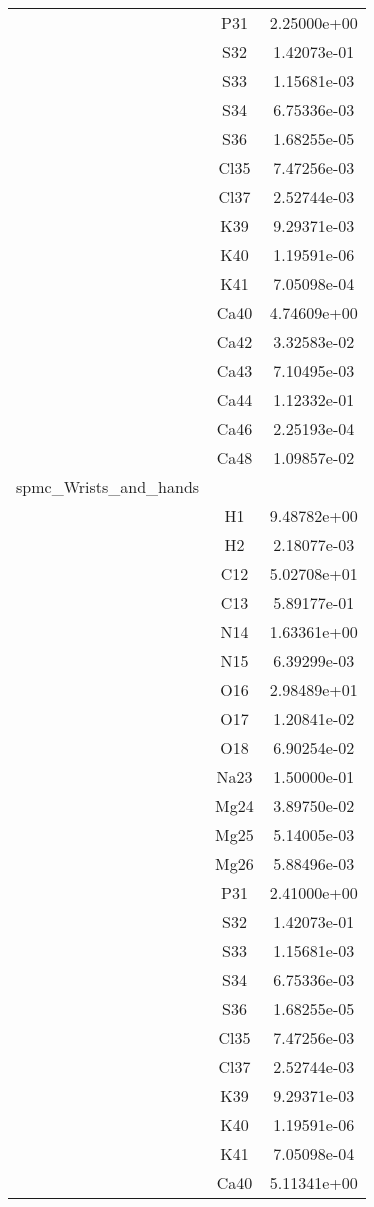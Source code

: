 \begin{centering}
\begin{longtable}{l c c}
& P31 & 2.25000e+00 \\ 
& S32 & 1.42073e-01 \\ 
& S33 & 1.15681e-03 \\ 
& S34 & 6.75336e-03 \\ 
& S36 & 1.68255e-05 \\ 
& Cl35 & 7.47256e-03 \\ 
& Cl37 & 2.52744e-03 \\ 
& K39 & 9.29371e-03 \\ 
& K40 & 1.19591e-06 \\ 
& K41 & 7.05098e-04 \\ 
& Ca40 & 4.74609e+00 \\ 
& Ca42 & 3.32583e-02 \\ 
& Ca43 & 7.10495e-03 \\ 
& Ca44 & 1.12332e-01 \\ 
& Ca46 & 2.25193e-04 \\ 
& Ca48 & 1.09857e-02 \\ 
\hline
spmc_Wrists_and_hands & & \\
\hline
& H1 & 9.48782e+00 \\ 
& H2 & 2.18077e-03 \\ 
& C12 & 5.02708e+01 \\ 
& C13 & 5.89177e-01 \\ 
& N14 & 1.63361e+00 \\ 
& N15 & 6.39299e-03 \\ 
& O16 & 2.98489e+01 \\ 
& O17 & 1.20841e-02 \\ 
& O18 & 6.90254e-02 \\ 
& Na23 & 1.50000e-01 \\ 
& Mg24 & 3.89750e-02 \\ 
& Mg25 & 5.14005e-03 \\ 
& Mg26 & 5.88496e-03 \\ 
& P31 & 2.41000e+00 \\ 
& S32 & 1.42073e-01 \\ 
& S33 & 1.15681e-03 \\ 
& S34 & 6.75336e-03 \\ 
& S36 & 1.68255e-05 \\ 
& Cl35 & 7.47256e-03 \\ 
& Cl37 & 2.52744e-03 \\ 
& K39 & 9.29371e-03 \\ 
& K40 & 1.19591e-06 \\ 
& K41 & 7.05098e-04 \\ 
& Ca40 & 5.11341e+00 \\ 

\end{longtable}
\end{centering}
